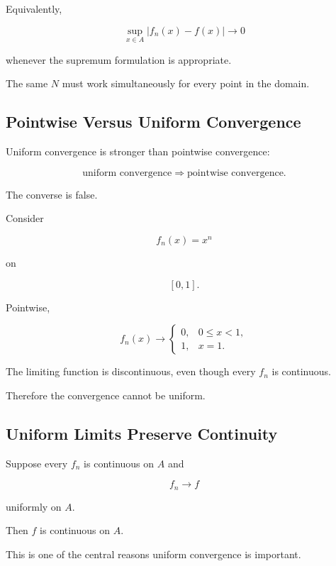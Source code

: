 Equivalently,

\[
\boxed{
\sup_{x\in A}
|f_n(x)-f(x)|
\to0
}
\]

whenever the supremum formulation is appropriate.

The same \(N\) must work simultaneously for every point in the domain.

\subsection{Pointwise Versus Uniform Convergence}
\label{subsec:pointwise-vs-uniform}

Uniform convergence is stronger than pointwise convergence:

\[
\boxed{
\text{uniform convergence}
\Longrightarrow
\text{pointwise convergence}.
}
\]

The converse is false.

Consider

\[
f_n(x)=x^n
\]

on

\[
[0,1].
\]

Pointwise,

\[
f_n(x)\to
\begin{cases}
0, & 0\leq x<1,\\
1, & x=1.
\end{cases}
\]

The limiting function is discontinuous, even though every \(f_n\) is
continuous.

Therefore the convergence cannot be uniform.

\subsection{Uniform Limits Preserve Continuity}
\label{subsec:uniform-limit-continuity}

\begin{theorem}
Suppose every \(f_n\) is continuous on \(A\) and

\[
f_n\to f
\]

uniformly on \(A\).

Then \(f\) is continuous on \(A\).
\end{theorem}

This is one of the central reasons uniform convergence is important.

